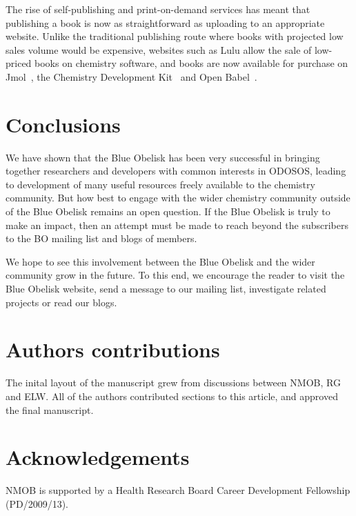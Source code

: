 \documentclass[10pt]{bmc_article}
\newenvironment{bmcformat}{\fussy\setboolean{publ}{true}}{\fussy}
\begin{document}
\begin{bmcformat}
The rise of self-publishing and print-on-demand services has meant
that publishing a book is now as straightforward as uploading to an
appropriate website. Unlike the traditional publishing route where
books with projected low sales volume would be expensive,
websites such as Lulu\cite{WebLulu} allow the sale of low-priced books on
chemistry software, and books are now available for purchase
on Jmol~\cite{JmolBook}, the Chemistry Development Kit~\cite{CDKBook}
and Open Babel~\cite{Open BabelBook}.

\section*{Conclusions}

We have shown that the Blue Obelisk has been very successful
in bringing together researchers and developers with common interests
in ODOSOS, leading to development of many useful resources freely
available to the chemistry community. But how best to engage with the
wider chemistry community outside of the Blue Obelisk remains an open
question. If the Blue Obelisk is truly to make an impact,
then an attempt must be made to reach beyond the subscribers to the
BO mailing list and blogs of members.

We hope to see this involvement between the Blue Obelisk and the wider
community grow in the future. To this end, we encourage the reader to
visit the Blue Obelisk website\cite{WebBlueObelisk}, send a message to our mailing list,
investigate related projects or read our blogs.


\section*{Authors contributions}
   The inital layout of the manuscript grew from discussions between
NMOB, RG and ELW. All of the authors contributed sections to this
article, and approved the final manuscript.

\section*{Acknowledgements}
  NMOB is supported by a Health Research Board Career Development
Fellowship (PD/2009/13).




\end{bmcformat}
\end{document}
